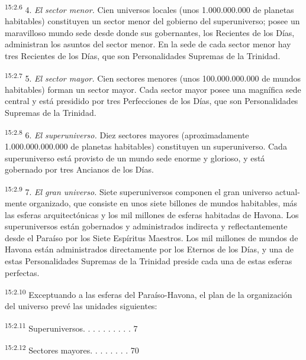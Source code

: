 \par
\textsuperscript{15:2.6} 4. \textit{El sector menor.} Cien universos locales (unos 1.000.000.000 de planetas habitables) constituyen un sector menor del gobierno del superuniverso; posee un maravilloso mundo sede desde donde sus gobernantes, los Recientes de los Días, administran los asuntos del sector menor. En la sede de cada sector menor hay tres Recientes de los Días, que son Personalidades Supremas de la Trinidad.

\par
\textsuperscript{15:2.7} 5. \textit{El sector mayor.} Cien sectores menores (unos 100.000.000.000 de mundos habitables) forman un sector mayor. Cada sector mayor posee una magnífica sede central y está presidido por tres Perfecciones de los Días, que son Personalidades Supremas de la Trinidad.

\par
\textsuperscript{15:2.8} 6. \textit{El superuniverso.} Diez sectores mayores (aproximadamente 1.000.000.000.000 de planetas habitables) constituyen un superuniverso. Cada superuniverso está provisto de un mundo sede enorme y glorioso, y está gobernado por tres Ancianos de los Días.

\par
\textsuperscript{15:2.9} 7. \textit{El gran universo.} Siete superuniversos componen el gran universo actual-mente organizado, que consiste en unos siete billones de mundos habitables, más las esferas arquitectónicas y los mil millones de esferas habitadas de Havona. Los superuniversos están gobernados y administrados indirecta y reflectantemente desde el Paraíso por los Siete Espíritus Maestros. Los mil millones de mundos de Havona están administrados directamente por los Eternos de los Días, y una de estas Personalidades Supremas de la Trinidad preside cada una de estas esferas perfectas.

\par
\textsuperscript{15:2.10} Exceptuando a las esferas del Paraíso-Havona, el plan de la organización del universo prevé las unidades siguientes:

\par
\textsuperscript{15:2.11} Superuniversos. . . . . . . . . . 7

\par
\textsuperscript{15:2.12} Sectores mayores. . . . . . . . 70

